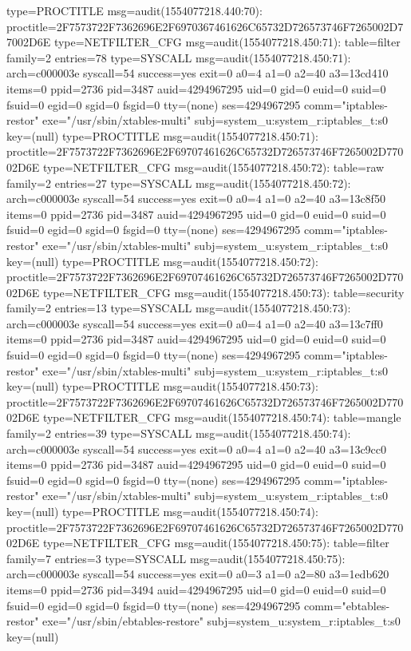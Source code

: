 \documentclass[]{report}
\newenvironment{Shaded}{}{}
\newcommand{\NormalTok}[1]{#1}
\begin{document}
\begin{Shaded}
\begin{Highlighting}[]
\NormalTok{type=PROCTITLE msg=audit(1554077218.440:70): proctitle=2F7573722F7362696E2F6970367461626C65732D726573746F7265002D77002D6E}
\NormalTok{type=NETFILTER_CFG msg=audit(1554077218.450:71): table=filter family=2 entries=78}
\NormalTok{type=SYSCALL msg=audit(1554077218.450:71): arch=c000003e syscall=54 success=yes exit=0 a0=4 a1=0 a2=40 a3=13cd410 items=0 ppid=2736 pid=3487 auid=4294967295 uid=0 gid=0 euid=0 suid=0 fsuid=0 egid=0 sgid=0 fsgid=0 tty=(none) ses=4294967295 comm="iptables-restor" exe="/usr/sbin/xtables-multi" subj=system_u:system_r:iptables_t:s0 key=(null)}
\NormalTok{type=PROCTITLE msg=audit(1554077218.450:71): proctitle=2F7573722F7362696E2F69707461626C65732D726573746F7265002D77002D6E}
\NormalTok{type=NETFILTER_CFG msg=audit(1554077218.450:72): table=raw family=2 entries=27}
\NormalTok{type=SYSCALL msg=audit(1554077218.450:72): arch=c000003e syscall=54 success=yes exit=0 a0=4 a1=0 a2=40 a3=13c8f50 items=0 ppid=2736 pid=3487 auid=4294967295 uid=0 gid=0 euid=0 suid=0 fsuid=0 egid=0 sgid=0 fsgid=0 tty=(none) ses=4294967295 comm="iptables-restor" exe="/usr/sbin/xtables-multi" subj=system_u:system_r:iptables_t:s0 key=(null)}
\NormalTok{type=PROCTITLE msg=audit(1554077218.450:72): proctitle=2F7573722F7362696E2F69707461626C65732D726573746F7265002D77002D6E}
\NormalTok{type=NETFILTER_CFG msg=audit(1554077218.450:73): table=security family=2 entries=13}
\NormalTok{type=SYSCALL msg=audit(1554077218.450:73): arch=c000003e syscall=54 success=yes exit=0 a0=4 a1=0 a2=40 a3=13c7ff0 items=0 ppid=2736 pid=3487 auid=4294967295 uid=0 gid=0 euid=0 suid=0 fsuid=0 egid=0 sgid=0 fsgid=0 tty=(none) ses=4294967295 comm="iptables-restor" exe="/usr/sbin/xtables-multi" subj=system_u:system_r:iptables_t:s0 key=(null)}
\NormalTok{type=PROCTITLE msg=audit(1554077218.450:73): proctitle=2F7573722F7362696E2F69707461626C65732D726573746F7265002D77002D6E}
\NormalTok{type=NETFILTER_CFG msg=audit(1554077218.450:74): table=mangle family=2 entries=39}
\NormalTok{type=SYSCALL msg=audit(1554077218.450:74): arch=c000003e syscall=54 success=yes exit=0 a0=4 a1=0 a2=40 a3=13c9cc0 items=0 ppid=2736 pid=3487 auid=4294967295 uid=0 gid=0 euid=0 suid=0 fsuid=0 egid=0 sgid=0 fsgid=0 tty=(none) ses=4294967295 comm="iptables-restor" exe="/usr/sbin/xtables-multi" subj=system_u:system_r:iptables_t:s0 key=(null)}
\NormalTok{type=PROCTITLE msg=audit(1554077218.450:74): proctitle=2F7573722F7362696E2F69707461626C65732D726573746F7265002D77002D6E}
\NormalTok{type=NETFILTER_CFG msg=audit(1554077218.450:75): table=filter family=7 entries=3}
\NormalTok{type=SYSCALL msg=audit(1554077218.450:75): arch=c000003e syscall=54 success=yes exit=0 a0=3 a1=0 a2=80 a3=1edb620 items=0 ppid=2736 pid=3494 auid=4294967295 uid=0 gid=0 euid=0 suid=0 fsuid=0 egid=0 sgid=0 fsgid=0 tty=(none) ses=4294967295 comm="ebtables-restor" exe="/usr/sbin/ebtables-restore" subj=system_u:system_r:iptables_t:s0 key=(null)}

\end{Highlighting}
\end{Shaded}
\end{document}
